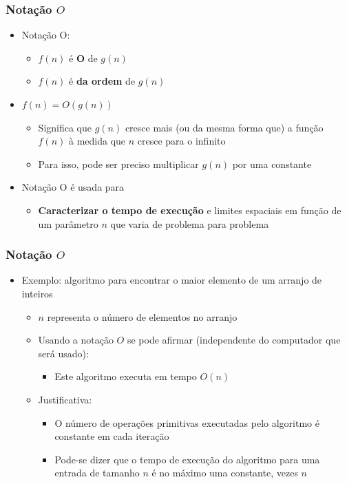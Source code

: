 \documentclass[aspectratio=169]{beamer}
\begin{document}
\begin{frame}\frametitle{Notação $O$}
\begin{itemize}
	\item Notação O:
	\begin{itemize}
		\item $f(n)$ é \textbf{O} de $g(n)$
		\item $f(n)$ é \textbf{da ordem} de $g(n)$
	\end{itemize}
	\item $f(n)=O(g(n))$
	\begin{itemize}
		\item Significa que $g(n)$ cresce mais (ou da mesma forma que) a função $f(n)$ à medida que $n$ cresce para o infinito
		\item Para isso, pode ser preciso multiplicar $g(n)$ por uma constante
	\end{itemize}
	\item Notação O é usada para
	\begin{itemize}
		\item \textbf{Caracterizar o tempo de execução} e limites espaciais em função de um parâmetro $n$ que varia de problema para problema
	\end{itemize}
\end{itemize}
\end{frame}

\begin{frame}\frametitle{Notação $O$}
\begin{itemize}
	\item Exemplo: algoritmo para encontrar o maior elemento de um arranjo de inteiros
	\begin{itemize}
		\item $n$ representa o número de elementos no arranjo
		\item Usando a notação $O$ se pode afirmar (independente do computador que será usado):
		\begin{itemize}
			\item Este algoritmo executa em tempo $O(n)$
		\end{itemize}
		\item Justificativa:
		\begin{itemize}
			\item O número de operações primitivas executadas pelo algoritmo é constante em cada iteração
			\item Pode-se dizer que o tempo de execução do algoritmo para uma entrada de tamanho $n$ é no máximo uma constante, vezes $n$
		\end{itemize}
	\end{itemize}
\end{itemize}
\end{frame}
\end{document}
